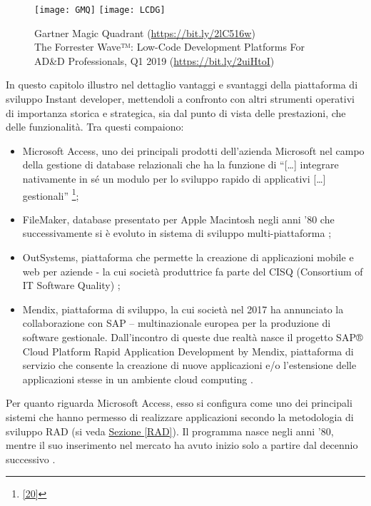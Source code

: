 \begin{figure}[!h] 
	\centering  
	\texttt{[image: GMQ]}
	\texttt{[image: LCDG]}
	\caption{Gartner Magic Quadrant (\url{https://bit.ly/2lC516w})\\ 
		The Forrester Wave™: Low-Code Development Platforms For AD\&D Professionals, Q1 2019  (\url{https://bit.ly/2uiHtoI})}
	\label{Graphic}
\end{figure}

In questo capitolo illustro nel dettaglio vantaggi e svantaggi della piattaforma di sviluppo Instant developer, mettendoli a confronto con altri strumenti operativi di importanza storica e strategica, sia dal punto di vista delle prestazioni, che delle funzionalità. Tra questi compaiono: 
\begin{itemize}
	\item Microsoft Access, uno dei principali prodotti dell'azienda Microsoft nel campo della gestione di database relazionali che ha la funzione di “[…] integrare nativamente in sé un modulo per lo sviluppo rapido di applicativi […] gestionali” \footnote[5]{\hyperref[bib20]{[20]}};
	
	\item FileMaker, database presentato per Apple Macintosh negli anni '80 che successivamente si è evoluto in sistema di sviluppo multi-piattaforma \cite{[21]} ;
	
	\item OutSystems, piattaforma che permette la creazione di applicazioni mobile e web per aziende - la cui società produttrice fa parte del CISQ (Consortium of IT Software Quality) \cite{[22]}; 
	
	\item Mendix, piattaforma di sviluppo, la cui società nel 2017 ha annunciato la collaborazione con SAP – multinazionale europea per la produzione di software gestionale. Dall'incontro di queste due realtà nasce il progetto SAP® Cloud Platform Rapid Application Development by Mendix, piattaforma di servizio che consente la creazione di nuove applicazioni e/o l'estensione delle applicazioni stesse in un ambiente cloud computing \cite{[23]}.
\end{itemize}
Per quanto riguarda Microsoft Access, esso si configura come uno dei principali sistemi che hanno permesso di realizzare applicazioni secondo la metodologia di sviluppo RAD (si veda \hyperref[RAD]{Sezione \ref{RAD}}). Il programma nasce negli anni '80, mentre il suo inserimento nel mercato ha avuto inizio solo a partire dal decennio successivo \cite{[20]}.
